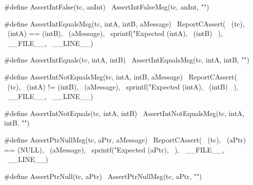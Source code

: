#define AssertIntFalse(tc, anInt) \
  AssertIntFalseMsg(tc, anInt, "")
\stopCHeader

\stopTestSuite

\startTestSuite[assertIntEquals]

\startCHeader
#define AssertIntEqualsMsg(tc, intA, intB, aMessage) \
  ReportCAssert(                                     \
    (tc),                                            \
    (intA) == (intB),                                \
    (aMessage),                                      \
    sprintf("Expected %
      (intA),                                        \
      (intB)                                         \
    ),                                               \
    __FILE__,                                        \
    __LINE__)

#define AssertIntEquals(tc, intA, intB) \
  AssertIntEqualsMsg(tc, intA, intB, "")
\stopCHeader

\stopTestSuite

\startTestSuite[assertIntNotEquals]

\startCHeader
#define AssertIntNotEqualsMsg(tc, intA, intB, aMessage) \
  ReportCAssert(                                        \
    (tc),                                               \
    (intA) != (intB),                                   \
    (aMessage),                                         \
    sprintf("Expected %
      (intA),                                           \
      (intB)                                            \
    ),                                                  \
    __FILE__,                                           \
    __LINE__)

#define AssertIntNotEquals(tc, intA, intB) \
  AssertIntNotEqualsMsg(tc, intA, intB, "")
\stopCHeader

\stopTestSuite

\startTestSuite[assertPrtNull]

\startCHeader
#define AssertPtrNullMsg(tc, aPtr, aMessage) \
  ReportCAssert(                             \
    (tc),                                    \
    (aPtr) == (NULL),                        \
    (aMessage),                              \
    sprintf("Expected %
      (aPtr),                                \
    ),                                       \
    __FILE__,                                \
    __LINE__)

#define AssertPtrNull(tc, aPtr) \
  AssertPtrNullMsg(tc, aPtr, "")
\stopCHeader

